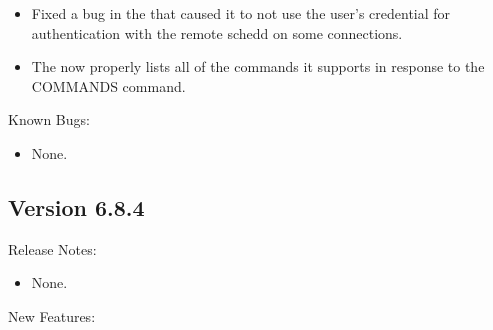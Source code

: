 \begin{itemize}
\item Fixed a bug in the  that caused it to not use the 
user's credential for authentication with the remote schedd on some 
connections.

\item The  now properly lists all of the commands it
supports in response to the COMMANDS command.

\end{itemize}

\noindent Known Bugs:

\begin{itemize}

\item None.

\end{itemize}


\subsection*{\label{sec:New-6-8-4}Version 6.8.4}

\noindent Release Notes:

\begin{itemize}

\item None.

\end{itemize}


\noindent New Features:

